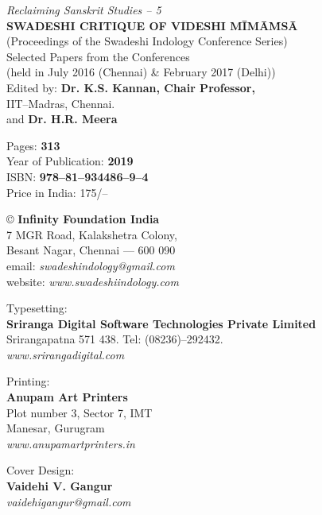 \thispagestyle{empty}

\textit{Reclaiming Sanskrit Studies – 5}\\\textbf{SWADESHI CRITIQUE OF VIDESHI MĪMĀṀSĀ}\\ (Proceedings of the Swadeshi Indology Conference Series)\\ Selected Papers from the Conferences\\ (held in July 2016 (Chennai) \& February 2017 (Delhi))\\ Edited by: \textbf{Dr. K.S. Kannan, Chair Professor,}\\ IIT–Madras, Chennai.\\ and \textbf{Dr. H.R. Meera}

Pages: \textbf{313}\\ Year of Publication: \textbf{2019}\\ ISBN: \textbf{978–81–934486–9–4}\\ Price in India: 175/–

© \textbf{Infinity Foundation India}\\ 7 MGR Road, Kalakshetra Colony,\\ Besant Nagar, Chennai –– 600 090\\ email: \textit{swadeshindology@gmail.com}\\ website: \textit{www.swadeshiindology.com}

Typesetting:\\\textbf{Sriranga Digital Software Technologies Private Limited}\\ Srirangapatna 571 438. Tel: (08236)–292432.\\\textit{www.srirangadigital.com}

Printing:\\\textbf{Anupam Art Printers}\\ Plot number 3, Sector 7, IMT\\ Manesar, Gurugram\\\textit{www.anupamartprinters.in}

Cover Design:\\\textbf{Vaidehi V. Gangur}\\\textit{vaidehigangur@gmail.com}

